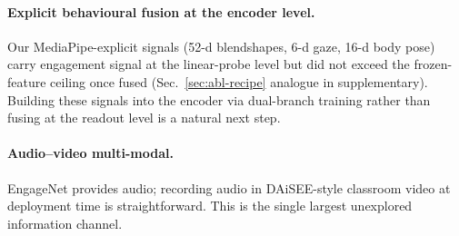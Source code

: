 \paragraph{Explicit behavioural fusion at the encoder level.} Our
MediaPipe-explicit signals (52-d blendshapes, 6-d gaze, 16-d body
pose) carry engagement signal at the linear-probe level but did
not exceed the frozen-feature ceiling once fused (Sec.~\ref{sec:abl-recipe}
analogue in supplementary). Building these signals into the
encoder via dual-branch training rather than fusing at the
readout level is a natural next step.

\paragraph{Audio--video multi-modal.} EngageNet provides audio;
recording audio in DAiSEE-style classroom video at deployment time
is straightforward. This is the single largest unexplored
information channel.
